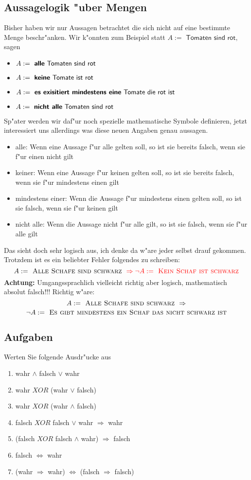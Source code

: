 \subsection{Aussagelogik "uber Mengen}
Bisher haben wir nur Aussagen betrachtet die sich nicht auf eine bestimmte Menge beschr"anken. Wir k"onnten zum Beispiel statt $A := \textsf{ Tomaten sind rot,} $ sagen 
\begin{itemize}
\item $A := \textsf{ \textbf{alle} Tomaten sind rot} $
\item $A := \textsf{ \textbf{keine} Tomate ist rot} $
\item $A := \textsf{ \textbf{es exisitiert mindestens eine} Tomate die rot ist} $
\item $A := \textsf{ \textbf{nicht alle} Tomaten sind rot} $
\end{itemize}
Sp"ater werden wir daf"ur noch spezielle mathematische Symbole definieren, jetzt interessiert uns allerdings was diese neuen Angaben genau aussagen.
\begin{itemize}
\item alle: Wenn eine Aussage f"ur alle gelten soll, so ist sie bereits falsch, wenn sie f"ur einen nicht gilt
\item keiner: Wenn eine Aussage f"ur keinen gelten soll, so ist sie bereits falsch, wenn sie f"ur mindestens einen gilt
\item mindestens einer: Wenn die Aussage f"ur mindestens einen gelten soll, so ist sie falsch, wenn sie f"ur keinen gilt
\item nicht alle: Wenn die Aussage nicht f"ur alle gilt, so ist sie falsch, wenn sie f"ur alle gilt
\end{itemize}

Das sieht doch sehr logisch aus, ich denke da w"are jeder selbst drauf gekommen. Trotzdem ist es ein beliebter Fehler folgendes zu schreiben:
$$A := \textsc{ Alle Schafe sind schwarz } \color{red} \Rightarrow \neg A := \textsc{ Kein Schaf ist schwarz}$$\textbf{Achtung:} Umgangssprachlich vielleicht richtig aber logisch, mathematisch absolut falsch!!! Richtig w"are:
$$A := \textsc{ Alle Schafe sind schwarz } \Rightarrow$$
$$\neg A := \textsc{ Es gibt mindestens ein Schaf das nicht schwarz ist}$$

\subsection{Aufgaben}
Werten Sie folgende Ausdr"ucke aus
\begin{enumerate}
	\item wahr $\land$ falsch $\lor$ wahr
	\item wahr $XOR$ (wahr $\lor$ falsch)
	\item wahr $XOR$ (wahr $\land$ falsch)
	\item falsch $XOR$ falsch $\lor$ wahr $\Rightarrow$ wahr
	\item (falsch $XOR$ falsch $\land$ wahr) $\Rightarrow$ falsch
	\item falsch $\iff$ wahr
	\item (wahr $\Rightarrow$ wahr) $\iff$ (falsch $\Rightarrow$ falsch)
\end{enumerate}

